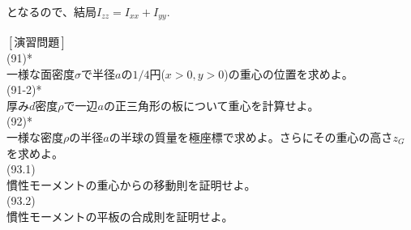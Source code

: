 \documentclass{jsarticle}
\begin{document}
となるので、結局\(I_{zz}=I_{xx}+I_{yy}\).\\
\\
\newpage
\noindent
\([演習問題]\)\\
(91)*\\
一様な面密度\(\sigma\)で半径\(a\)の\(1/4\)円(\(x>0,y>0\))の重心の位置を求めよ。\\
(91-2)*\\
厚み\(d\)密度\(\rho\)で一辺\(a\)の正三角形の板について重心を計算せよ。\\
(92)*\\
一様な密度\(\rho\)の半径\(a\)の半球の質量を極座標で求めよ。さらにその重心の高さ\(z_{G}\)を求めよ。\\
(93.1)\\
慣性モーメントの重心からの移動則を証明せよ。\\
(93.2)\\
慣性モーメントの平板の合成則を証明せよ。\\
\end{document}
